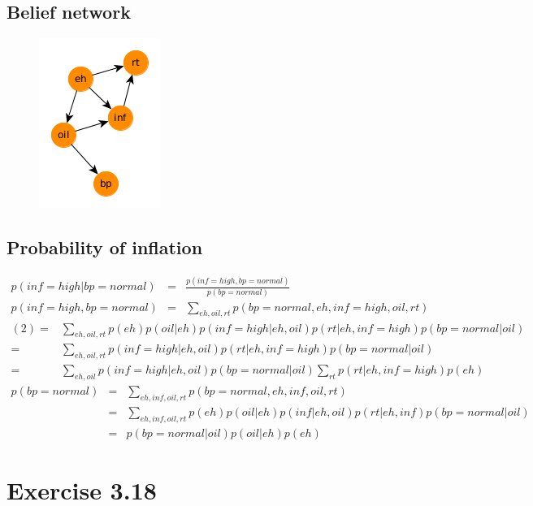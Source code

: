 \documentclass[paper=a4, fontsize=11pt]{scrartcl} %
\begin{document}
    \subsection*{Belief network}
        \begin{figure}[H]
            \centering
            \includegraphics[width=0.3\linewidth]{../images/barber_ex3-15.png}
        \end{figure}

    \subsection*{Probability of inflation}
    \begin{eqnarray}
    p(inf=high | bp=normal) & = &\frac{p(inf=high, bp=normal)}{p(bp=normal)} \\
    p(inf=high, bp=normal) & = & \sum_{eh,oil,rt}p(bp=normal,eh,inf=high,oil,rt) %
    \end{eqnarray}
    \begin{eqnarray}
    (2) = & \sum_{eh,oil,rt} p(eh) p(oil|eh) p(inf=high | eh, oil) p(rt | eh, inf=high) p(bp=normal|oil) \\
        = & \sum_{eh,oil,rt} p(inf=high | eh, oil) p(rt | eh, inf=high) p(bp=normal|oil)\\
        = & \sum_{eh,oil} p(inf=high | eh, oil) p(bp=normal|oil) \sum_{rt} p(rt | eh, inf=high) p(eh)
    \end{eqnarray}
    \begin{eqnarray}
    p(bp=normal) & = & \sum_{eh,inf,oil,rt}p(bp=normal,eh,inf,oil,rt) \\
    & = & \sum_{eh,inf,oil,rt} p(eh) p(oil|eh) p(inf | eh, oil) p(rt | eh, inf) p(bp=normal|oil) \\
    & = & p(bp=normal | oil)p(oil | eh)p(eh)
    \end{eqnarray}

\section*{Exercise 3.18}
\end{document}
